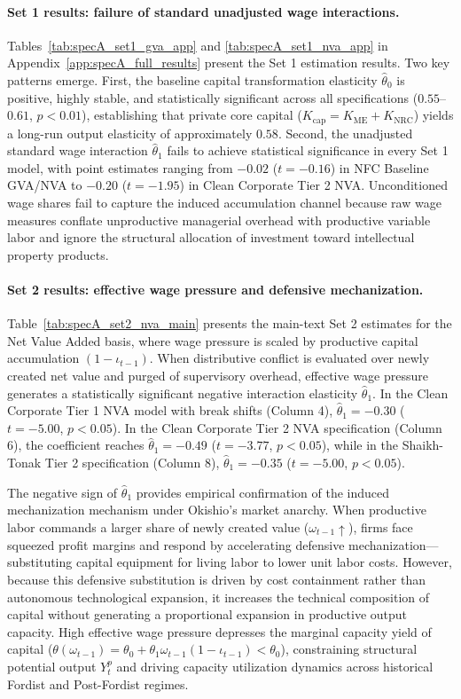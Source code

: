 \paragraph{Set 1 results: failure of standard unadjusted wage interactions.}
Tables~\ref{tab:specA_set1_gva_app} and \ref{tab:specA_set1_nva_app} in Appendix~\ref{app:specA_full_results} present the Set 1 estimation results. Two key patterns emerge. First, the baseline capital transformation elasticity $\hat{\theta}_0$ is positive, highly stable, and statistically significant across all specifications ($0.55$--$0.61$, $p < 0.01$), establishing that private core capital ($K_{\text{cap}} = K_{\text{ME}} + K_{\text{NRC}}$) yields a long-run output elasticity of approximately $0.58$. Second, the unadjusted standard wage interaction $\hat{\theta}_1$ fails to achieve statistical significance in every Set 1 model, with point estimates ranging from $-0.02$ ($t = -0.16$) in NFC Baseline GVA/NVA to $-0.20$ ($t = -1.95$) in Clean Corporate Tier 2 NVA. Unconditioned wage shares fail to capture the induced accumulation channel because raw wage measures conflate unproductive managerial overhead with productive variable labor and ignore the structural allocation of investment toward intellectual property products.

\paragraph{Set 2 results: effective wage pressure and defensive mechanization.}
Table~\ref{tab:specA_set2_nva_main} presents the main-text Set 2 estimates for the Net Value Added basis, where wage pressure is scaled by productive capital accumulation $(1 - \iota_{t-1})$. When distributive conflict is evaluated over newly created net value and purged of supervisory overhead, effective wage pressure generates a statistically significant negative interaction elasticity $\hat{\theta}_1$. In the Clean Corporate Tier 1 NVA model with break shifts (Column 4), $\hat{\theta}_1 = -0.30$ ($t = -5.00$, $p < 0.05$). In the Clean Corporate Tier 2 NVA specification (Column 6), the coefficient reaches $\hat{\theta}_1 = -0.49$ ($t = -3.77$, $p < 0.05$), while in the Shaikh-Tonak Tier 2 specification (Column 8), $\hat{\theta}_1 = -0.35$ ($t = -5.00$, $p < 0.05$).

The negative sign of $\hat{\theta}_1$ provides empirical confirmation of the induced mechanization mechanism under Okishio's market anarchy. When productive labor commands a larger share of newly created value ($\omega_{t-1} \uparrow$), firms face squeezed profit margins and respond by accelerating defensive mechanization---substituting capital equipment for living labor to lower unit labor costs. However, because this defensive substitution is driven by cost containment rather than autonomous technological expansion, it increases the technical composition of capital without generating a proportional expansion in productive output capacity. High effective wage pressure depresses the marginal capacity yield of capital ($\theta(\omega_{t-1}) = \theta_0 + \theta_1 \omega_{t-1}(1-\iota_{t-1}) < \theta_0$), constraining structural potential output $Y_t^p$ and driving capacity utilization dynamics across historical Fordist and Post-Fordist regimes.

